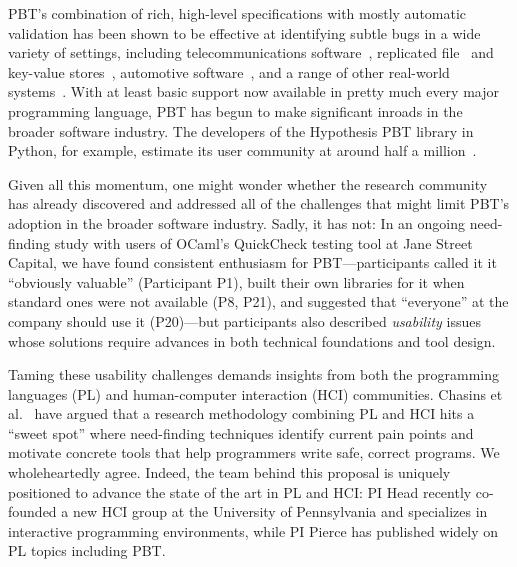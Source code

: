 PBT's combination of rich, high-level specifications with mostly
automatic validation has been shown to be effective at identifying subtle
bugs in a wide variety of settings, including telecommunications
software~\cite{arts2006testing}, replicated
file~\cite{MysteriesOfDropbox2016} and key-value
stores~\cite{Bornholt2021}, automotive software~\cite{arts2015testing}, and a range
of other real-world systems~\cite{hughes2016experiences}. With at
least basic support
now available in pretty much every major programming language\iflater {}\fi, PBT has
begun to make significant inroads in the broader software
industry.  The developers of the Hypothesis PBT library in
Python, for example, estimate its user community at around half a million~\cite{ZacPersonalCommunication}.

\newcommand{\participant}[1]{{P#1}}

Given all this momentum, one might wonder whether the research community
has already discovered and addressed all of the challenges that might limit PBT's adoption
in the broader software industry.  Sadly, it has not:
In an ongoing need-finding study with users of OCaml's QuickCheck testing tool
at Jane Street Capital, we have found
consistent enthusiasm for PBT---participants called it it
``obviously valuable'' (Participant \participant{1}),
built their own libraries for it when standard ones were not available
(\participant{8},
\participant{21}), and suggested that ``everyone'' at the company should use it
(\participant{20})---but participants also described {\em usability} issues
whose solutions require advances in both technical foundations and
tool design.\iflater{}\fi

Taming these usability challenges demands insights from both the
programming languages (PL) and
human-computer interaction (HCI) communities.  Chasins et
al.~\cite{chasins_pl_2021} have argued that a research methodology
combining PL and HCI hits a ``sweet spot'' where need-finding techniques identify
current pain points and motivate concrete tools that help programmers write
safe, correct programs. We wholeheartedly agree.
Indeed, the team behind this proposal is uniquely positioned to advance the
state of the art in PL and HCI: PI Head recently co-founded
a new HCI group at the University of Pennsylvania and specializes in interactive
programming environments, while PI Pierce has
published widely on PL topics including PBT.

